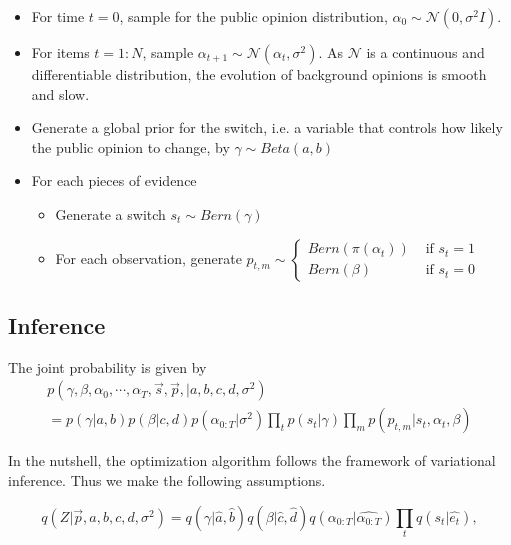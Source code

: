 \documentclass[runningheads]{llncs}
\newcommand{\Gaussian}{\mathcal{N}}
\begin{document}
\vspace{-0.6cm}
\begin{itemize}
\item For time $t=0$, sample  for the public opinion distribution, $\alpha_0\sim \Gaussian(0,\sigma^2 I)$.
\item For items $t=1: N$, sample $\alpha_{t+1}\sim \Gaussian(\alpha_t,\sigma^2)$. As $\Gaussian$ is a continuous and differentiable distribution, the evolution of background opinions is smooth and slow.
\item Generate a global prior for the switch, i.e. a variable that controls how likely the public opinion to change, by $\gamma\sim Beta(a,b)$
\end{itemize}
\begin{itemize}
\item For each pieces of evidence
\begin{itemize}
\item Generate a switch $s_t \sim Bern(\gamma)$
\item For each observation, generate $p_{t,m}\sim \begin{cases}
Bern(\pi(\alpha_t)) & \text{ if } s_{t}= 1\\ 
Bern(\beta) & \text{ if } s_{t}= 0 
\end{cases}$
\end{itemize}
\end{itemize}





\vspace{-0.6cm}
\subsection{Inference}
The joint probability is given by
\begin{multline}
    p(\gamma,\beta,\alpha_0,\cdots,\alpha_T, \vec{s},\vec{p}, |a,b,c,d,\sigma^2) \\
    =    p(\gamma|a,b) p(\beta|c,d)  p(\alpha_{0:T}|\sigma^2) \prod_t  p(s_{t}|\gamma) \prod_m p(p_{t,m}|s_{t},\alpha_t,\beta) 
\end{multline}


    
In the nutshell, the optimization algorithm follows the framework of variational inference. Thus we make the following assumptions. 

\begin{equation*}
q(Z|\vec{p},a,b,c,d,\sigma^2) = q(\gamma|\hat{a},\hat{b}) q(\beta|\hat{c},\hat{d}) q(\alpha_{0:T}|\hat{\alpha_{0:T}})\prod_{t} q(s_{t}|\hat{e_{t}}) , 
\end{equation*}
\vspace{-0.6cm}
\end{document}
